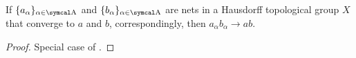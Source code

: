\begin{proposition}\label{thm:limits_are_topological_group_homomorphisms}
  If \( \{ a_\alpha \}_{\alpha \in \CA} \) and \( \{ b_\alpha \}_{\alpha \in \CA} \) are nets in a Hausdorff topological group \( X \) that converge to \( a \) and \( b \), correspondingly, then \( a_\alpha b_\alpha \to a b \).
\end{proposition}
\begin{proof}
  Special case of .
\end{proof}
